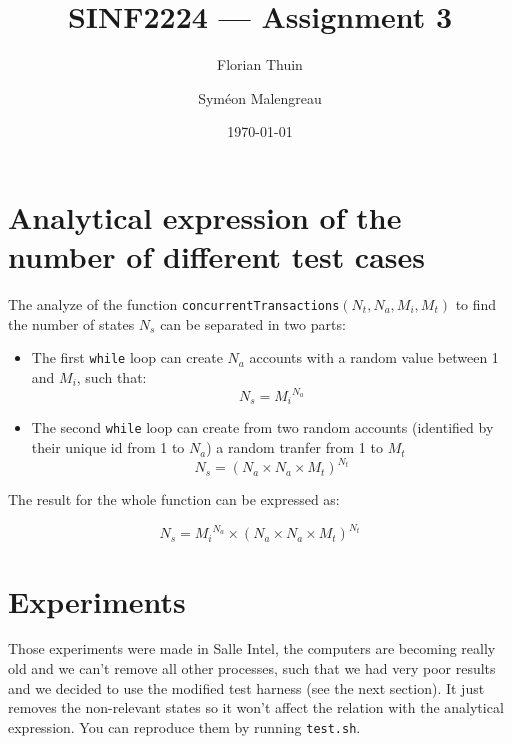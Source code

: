 \documentclass[11pt, a4paper]{article}
\title{SINF2224 --- Assignment 3}
\author{Florian Thuin \and Syméon Malengreau}
\date{\today}
\begin{document}
    \maketitle

    \section{Analytical expression of the number of different test cases}

    The analyze of the function \verb#concurrentTransactions#$(N_t, N_a, M_i, M_t)$
    to find the number of states $N_s$ can be separated in two parts:

    \begin{itemize}
        \item The first \verb#while# loop can create $N_a$ accounts with a
        random value between 1 and $M_i$, such that:
            $$N_s = {M_i}^{N_a}$$
        \item The second \verb#while# loop can create from two random accounts
        (identified by their unique id from 1 to $N_a$) a random tranfer from 1
        to $M_t$
            $$N_s = {(N_a \times N_a \times M_t)}^{N_t}$$
    \end{itemize}

    The result for the whole function can be expressed as:

    $$N_s = {M_i}^{N_a} \times {(N_a \times N_a \times M_t)}^{N_t}$$

    \section{Experiments}

    Those experiments were made in Salle Intel, the computers are becoming really
    old and we can't remove all other processes, such that we had very poor results
    and we decided to use the modified test harness (see the next section).
    It just removes the non-relevant states so it won't affect the
    relation with the analytical expression. You can reproduce them by
    running \verb#test.sh#.
\end{document}
